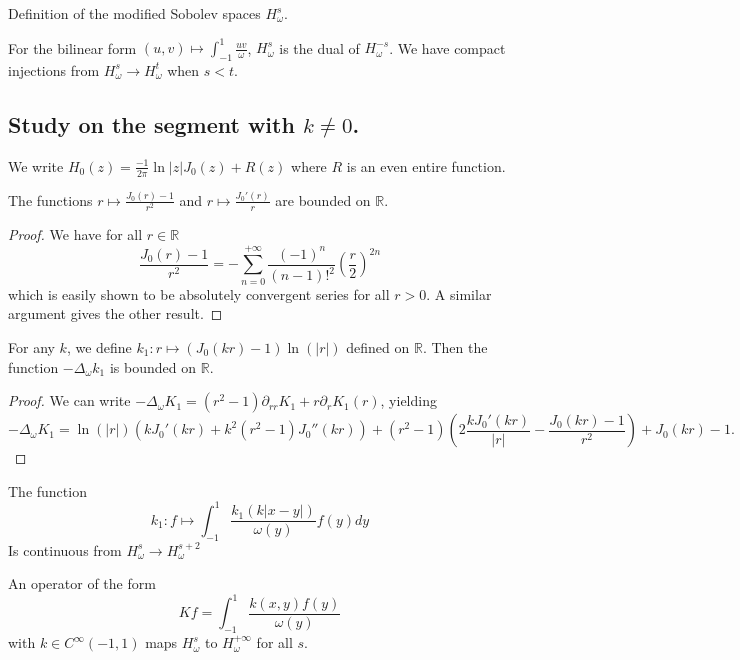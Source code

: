 \documentclass[]{article}
\begin{document}
\begin{Def}
	Definition of the modified Sobolev spaces $H^s_{\omega}$.
\end{Def}
\begin{The}
	For the bilinear form $(u,v)\mapsto\int_{-1}^{1}\frac{uv}{\omega}$, $H^s_{\omega}$ is the dual of $H^{-s}_{\omega}$. We have compact injections from $H^s_{\omega} \to H^t_{\omega}$ when $s < t$. 
\end{The}

\subsection{Study on the segment with $k \neq 0$.}

We write $H_0(z) = \frac{-1}{2\pi} \ln|z| J_0(z) + R(z)$ where $R$ is an even entire function. 

\begin{Prop}
	The functions $r \mapsto \frac{J_0(r) - 1}{r^2}$ and $r \mapsto \frac{J_0'(r)}{r}$ are bounded on $\mathbb{R}$. 
	\begin{proof}
		We have for all $r \in \mathbb{R}$
		\[\frac{J_0(r)-1}{r^2} = -\sum_{n=0}^{+\infty} \frac{(-1)^n}{(n-1)!^2}\left(\frac{r}{2}\right)^{2n}\]
		which is easily shown to be absolutely convergent series for all $r >0$. 
		A similar argument gives the other result. 
	\end{proof}	
\end{Prop}
\begin{Prop}
	For any $k$, we define $ k_1 : r \mapsto \left(J_0(kr) - 1 \right) \ln(|r|)$ defined on $\mathbb{R}$. Then the function $-\Delta_{\omega} k_1$ is bounded on $\mathbb{R}$. 
	\begin{proof}
		We can write $-\Delta_{\omega}K_1 = (r^2-1) \partial_{rr}K_1 + r \partial_r K_1(r)$, yielding 
		\[-\Delta_{\omega}K_1 = \ln(|r|) \left(kJ_0'(kr) + k^2(r^2 - 1)J_0''(kr)\right) + (r^2-1) \left(2\frac{kJ_0'(kr)}{|r|} - \frac{J_0(kr) - 1}{r^2}\right) + J_0(kr) - 1.\]
	\end{proof}
\end{Prop}
\begin{Cor} The function 
	\[k_1 : f \mapsto \int_{-1}^{1}\frac{k_1(k|x-y|)}{\omega(y)}f(y)dy\]
	Is continuous from $H^s_{\omega} \to H^{s+2}_{\omega}$  
\end{Cor}

\begin{The}
	An operator of the form 
	\begin{equation}
		Kf = \int_{-1}^{1} \frac{k(x,y)f(y)}{\omega(y)}
	\end{equation}
	with $k \in C^{\infty}(-1,1)$ maps $H^s_{\omega}$ to $H^{+\infty}_{\omega}$ for all $s$. 
\end{The}
\end{document}
